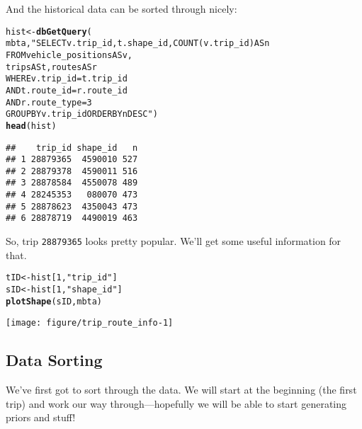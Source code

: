 \documentclass[11pt]{article}\usepackage[]{graphicx}\usepackage[]{color}
\makeatletter
\def\maxwidth{ %
  \ifdim\Gin@nat@width>\linewidth
    \linewidth
  \else
    \Gin@nat@width
  \fi
}
\newcommand{\hlnum}[1]{\textcolor[rgb]{0.686,0.059,0.569}{#1}}%
\newcommand{\hlstr}[1]{\textcolor[rgb]{0.192,0.494,0.8}{#1}}%
\newcommand{\hlstd}[1]{\textcolor[rgb]{0.345,0.345,0.345}{#1}}%
\newcommand{\hlkwb}[1]{\textcolor[rgb]{0.69,0.353,0.396}{#1}}%
\newcommand{\hlkwd}[1]{\textcolor[rgb]{0.737,0.353,0.396}{\textbf{#1}}}%
\newenvironment{kframe}{%
 \def\at@end@of@kframe{}%
 \ifinner\ifhmode%
  \def\at@end@of@kframe{\end{minipage}}%
  \begin{minipage}{\columnwidth}%
 \fi\fi%
 \def\FrameCommand##1{\hskip\@totalleftmargin \hskip-\fboxsep
 \colorbox{shadecolor}{##1}\hskip-\fboxsep
     \hskip-\linewidth \hskip-\@totalleftmargin \hskip\columnwidth}%
 \MakeFramed {\advance\hsize-\width
   \@totalleftmargin\z@ \linewidth\hsize
   \@setminipage}}%
 {\par\unskip\endMakeFramed%
 \at@end@of@kframe}
\newenvironment{knitrout}{}{} %
\makeatother
\begin{document}
And the historical data can be sorted through nicely:
\begin{knitrout}
\color{fgcolor}\begin{kframe}
\begin{alltt}
\hlstd{hist} \hlkwb{<-} \hlkwd{dbGetQuery}\hlstd{(}
    \hlstd{mbta,} \hlstr{"SELECT v.trip_id, t.shape_id, COUNT(v.trip_id) AS n
           FROM vehicle_positions AS v, 
                trips AS t, routes AS r
           WHERE v.trip_id=t.trip_id
             AND t.route_id=r.route_id
             AND r.route_type=3
           GROUP BY v.trip_id ORDER BY n DESC"}\hlstd{)}
\hlkwd{head}\hlstd{(hist)}
\end{alltt}
\begin{verbatim}
##    trip_id shape_id   n
## 1 28879365  4590010 527
## 2 28879378  4590011 516
## 3 28878584  4550078 489
## 4 28245353   080070 473
## 5 28878623  4350043 473
## 6 28878719  4490019 463
\end{verbatim}
\end{kframe}
\end{knitrout}

So, trip \verb+28879365+ looks pretty popular. We'll get some useful information for that.
\begin{knitrout}
\color{fgcolor}\begin{kframe}
\begin{alltt}
\hlstd{tID} \hlkwb{<-} \hlstd{hist[}\hlnum{1}\hlstd{,} \hlstr{"trip_id"}\hlstd{]}
\hlstd{sID} \hlkwb{<-} \hlstd{hist[}\hlnum{1}\hlstd{,} \hlstr{"shape_id"}\hlstd{]}
\hlkwd{plotShape}\hlstd{(sID, mbta)}
\end{alltt}
\end{kframe}

{\centering \texttt{[image: figure/trip\_route\_info-1]} 

}



\end{knitrout}


\subsection{Data Sorting}

We've first got to sort through the data. We will start at the beginning (the first trip) and work
our way through---hopefully we will be able to start generating priors and stuff!
\end{document}
